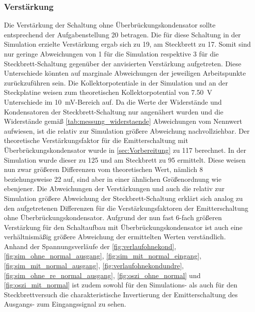\documentclass[12pt,english,ngerman]{scrartcl}
\begin{document}
\subsubsection{Verstärkung}
Die Verstärkung der Schaltung ohne Überbrückungskondensator sollte entsprechend der
Aufgabenstellung \num{20} betragen. Die für diese Schaltung in der Simulation erzielte Verstärkung ergab 
sich zu \num{19}, am Steckbrett zu \num{17}. Somit sind nur geringe Abweichungen von \num{1} für die Simulation
respektive \num{3} für die Steckbrett-Schaltung gegenüber der anvisierten Verstärkung aufgetreten. Diese
Unterschiede könnten auf marginale Abweichungen der jeweiligen Arbeitspunkte zurückzuführen sein. Die Kollektorpotentiale
in der Simulation und an der Steckplatine weisen zum theoretischen Kollektorpotential von \SI{7,50}{\volt} Unterschiede 
im \SI{10}{\milli\volt}-Bereich auf. Da die Werte der Widerstände und Kondensatoren der Steckbrett-Schaltung nur
angenähert wurden und die Widerstände gemäß \autoref{tab:messung_widerstaende} Abweichungen vom Nennwert aufwiesen, ist
die relativ zur Simulation größere Abweichung nachvollziehbar.
\newline
Der theoretische Verstärkungsfaktor für die Emitterschaltung mit Überbrückungskondensator wurde in \autoref{sec:Vorbereitung}
zu \num{117} berechnet. In der Simulation wurde dieser zu \num{125} und am Steckbrett zu \num{95} ermittelt. Diese weisen nun
zwar größeren Differenzen vom theoretischen Wert, nämlich \num{8} beziehungsweise \num{22} auf, sind aber in einer ähnlichen 
Größenordnung wie ebenjener. Die Abweichungen der Verstärkungen und auch die relativ zur Simulation größere Abweichung 
der Steckbrett-Schaltung erklärt sich analog zu den aufgetretenen Differenzen für die Verstärkungsfaktoren der 
Emitterschaltung ohne Überbrückungskondensator. Aufgrund der nun fast 6-fach größeren Verstärkung für den Schaltaufbau
mit Überbrückungskondensator ist auch eine verhältnismäßig größere Abweichung der ermittelten Werten verständlich.
\newline
Anhand der Spannungsverläufe der \autoref{fig:verlaufohnekond}, \autoref{fig:sim_ohne_normal_ausgang}, \autoref{fig:sim_mit_normal_eingang},
\autoref{fig:sim_mit_normal_ausgang}, \autoref{fig:verlaufohnekondundre}, \autoref{fig:sim_ohne_re_normal_ausgang},
\autoref{fig:oszi_ohne_normal} und \autoref{fig:oszi_mit_normal} ist zudem sowohl für den Simulations- als auch für den Steckbrettversuch die 
charakteristische Invertierung der Emitterschaltung des Ausgangs- zum Eingangssignal zu sehen.
\end{document}
